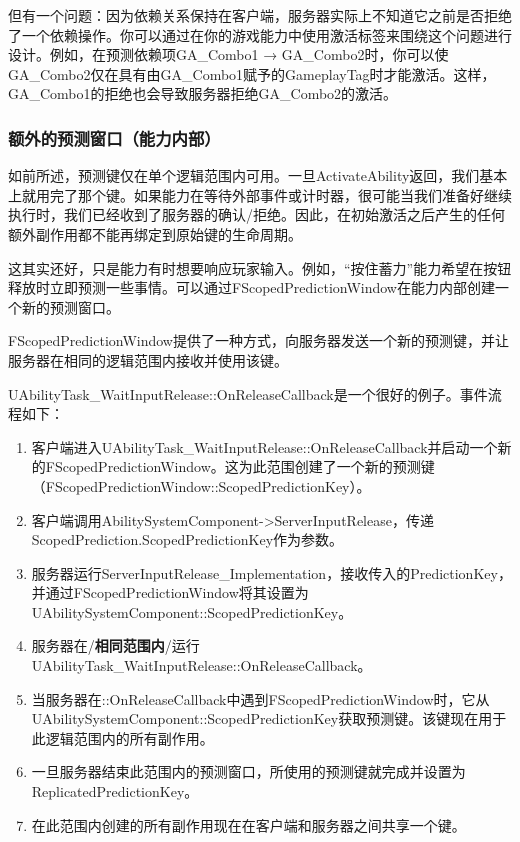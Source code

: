 \documentclass[10pt,CJKmath]{ctexart}
\begin{document}
但有一个问题：因为依赖关系保持在客户端，服务器实际上不知道它之前是否拒绝了一个依赖操作。你可以通过在你的游戏能力中使用激活标签来围绕这个问题进行设计。例如，在预测依赖项GA\_Combo1 → GA\_Combo2时，你可以使GA\_Combo2仅在具有由GA\_Combo1赋予的GameplayTag时才能激活。这样，GA\_Combo1的拒绝也会导致服务器拒绝GA\_Combo2的激活。

\subsubsection{额外的预测窗口（能力内部）}
如前所述，预测键仅在单个逻辑范围内可用。一旦ActivateAbility返回，我们基本上就用完了那个键。如果能力在等待外部事件或计时器，很可能当我们准备好继续执行时，我们已经收到了服务器的确认/拒绝。因此，在初始激活之后产生的任何额外副作用都不能再绑定到原始键的生命周期。

这其实还好，只是能力有时想要响应玩家输入。例如，“按住蓄力”能力希望在按钮释放时立即预测一些事情。可以通过FScopedPredictionWindow在能力内部创建一个新的预测窗口。

FScopedPredictionWindow提供了一种方式，向服务器发送一个新的预测键，并让服务器在相同的逻辑范围内接收并使用该键。

UAbilityTask\_WaitInputRelease::OnReleaseCallback是一个很好的例子。事件流程如下：
\begin{enumerate}
	\item 客户端进入UAbilityTask\_WaitInputRelease::OnReleaseCallback并启动一个新的FScopedPredictionWindow。这为此范围创建了一个新的预测键（FScopedPredictionWindow::ScopedPredictionKey）。
	\item 客户端调用AbilitySystemComponent->ServerInputRelease，传递ScopedPrediction.ScopedPredictionKey作为参数。
	\item 服务器运行ServerInputRelease\_Implementation，接收传入的PredictionKey，并通过FScopedPredictionWindow将其设置为UAbilitySystemComponent::ScopedPredictionKey。
	\item 服务器在/\textbf{相同范围内}/运行UAbilityTask\_WaitInputRelease::OnReleaseCallback。
	\item 当服务器在::OnReleaseCallback中遇到FScopedPredictionWindow时，它从UAbilitySystemComponent::ScopedPredictionKey获取预测键。该键现在用于此逻辑范围内的所有副作用。
	\item 一旦服务器结束此范围内的预测窗口，所使用的预测键就完成并设置为ReplicatedPredictionKey。
	\item 在此范围内创建的所有副作用现在在客户端和服务器之间共享一个键。
\end{enumerate}
\end{document}
